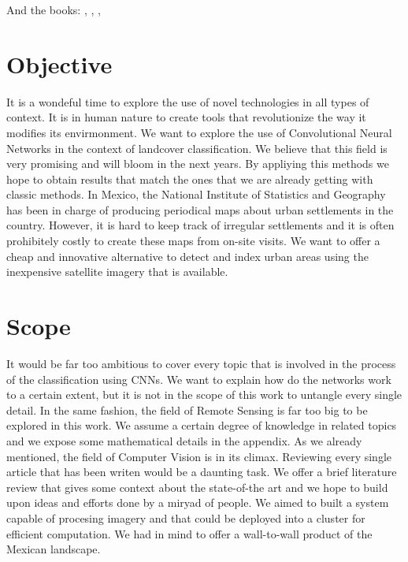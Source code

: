And the books: \cite{canty2014image}, \cite{richards2013remote}, \cite{tso2009classification} ,\cite{hastie01statisticallearning}

\section{Objective}

It is a wondeful time to explore the use of novel technologies in all types of context. It is in human nature to create tools that revolutionize the way it modifies its envirmonment. We want to explore the use of Convolutional Neural Networks in the context of landcover classification. We believe that this field is very promising and will bloom in the next years. By appliying this methods we hope to obtain results that match the ones that we are already getting with classic methods. In Mexico, the National Institute of Statistics and Geography has been in charge of producing periodical maps about urban settlements in the country. However, it is hard to keep track of irregular settlements and it is often prohibitely costly to create these maps from on-site visits. We want to offer a cheap and innovative alternative to detect and index urban areas using the inexpensive satellite imagery that is available.\\

\section{Scope}

It would be far too ambitious to cover every topic that is involved in the process of the classification using CNNs. We want to explain how do the networks work to a certain extent, but it is not in the scope of this work to untangle every single detail. In the same fashion, the field of Remote Sensing is far too big to be explored in this work. We assume a certain degree of knowledge in related topics and we expose some mathematical details in the appendix. As we already mentioned, the field of Computer Vision is in its climax. Reviewing every single article that has been writen would be a daunting task. We offer a brief literature review that gives some context about the state-of-the art and we hope to build upon ideas and efforts done by a miryad of people. We aimed to built a system capable of procesing imagery and that could be deployed into a cluster for efficient computation. We had in mind to offer a wall-to-wall product of the Mexican landscape.\\
